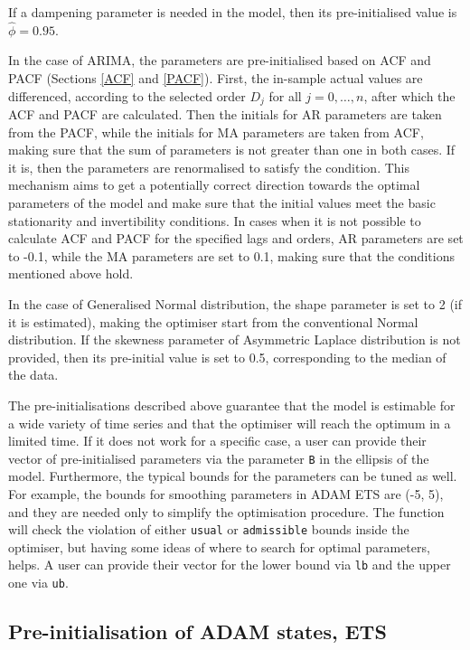 \documentclass[
]{book}
\theoremstyle{definition}
\theoremstyle{definition}
\theoremstyle{definition}
\theoremstyle{definition}
\theoremstyle{remark}
\begin{document}
If a dampening parameter is needed in the model, then its pre-initialised value is \(\hat{\phi}=0.95\).

In the case of ARIMA, the parameters are pre-initialised based on ACF and PACF (Sections \ref{ACF} and \ref{PACF}). First, the in-sample actual values are differenced, according to the selected order \(D_j\) for all \(j=0,\dots,n\), after which the ACF and PACF are calculated. Then the initials for AR parameters are taken from the PACF, while the initials for MA parameters are taken from ACF, making sure that the sum of parameters is not greater than one in both cases. If it is, then the parameters are renormalised to satisfy the condition. This mechanism aims to get a potentially correct direction towards the optimal parameters of the model and make sure that the initial values meet the basic stationarity and invertibility conditions. In cases when it is not possible to calculate ACF and PACF for the specified lags and orders, AR parameters are set to -0.1, while the MA parameters are set to 0.1, making sure that the conditions mentioned above hold.

In the case of Generalised Normal distribution, the shape parameter is set to 2 (if it is estimated), making the optimiser start from the conventional Normal distribution. If the skewness parameter of Asymmetric Laplace distribution is not provided, then its pre-initial value is set to 0.5, corresponding to the median of the data.

The pre-initialisations described above guarantee that the model is estimable for a wide variety of time series and that the optimiser will reach the optimum in a limited time. If it does not work for a specific case, a user can provide their vector of pre-initialised parameters via the parameter \texttt{B} in the ellipsis of the model. Furthermore, the typical bounds for the parameters can be tuned as well. For example, the bounds for smoothing parameters in ADAM ETS are (-5, 5), and they are needed only to simplify the optimisation procedure. The function will check the violation of either \texttt{usual} or \texttt{admissible} bounds inside the optimiser, but having some ideas of where to search for optimal parameters, helps. A user can provide their vector for the lower bound via \texttt{lb} and the upper one via \texttt{ub}.

\hypertarget{pre-initialisation-of-adam-states-ets}{%
\subsection{Pre-initialisation of ADAM states, ETS}\label{pre-initialisation-of-adam-states-ets}}
\end{document}
